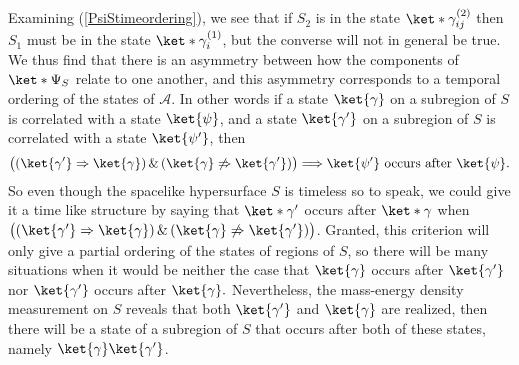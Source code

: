 Examining (\ref{PsiStimeordering}), we see that if $S_2$ is in the state $\ket*{\gamma^{(2)}_{ij}}$ then $S_1$ must be in the state $\ket*{\gamma^{(1)}_{i}}$, but the converse will not in general be true. We thus find that there is an asymmetry between how the components of $\ket*{\Psi_S}$ relate to one another, and this asymmetry corresponds to a temporal ordering of the states of $\mathcal{A}$. In other words if a state $\ket{\gamma}$ on a subregion of $S$ is correlated with a state $\ket{\psi}$, and a state $\ket{\gamma'}$ on a subregion of $S$ is correlated with a state $\ket{\psi'}$, then 
\begin{equation}\label{timeordering}
\big((\ket{\gamma'}\Rightarrow\ket{\gamma})\,\& \,(\ket{\gamma}\not\Rightarrow\ket{\gamma'})\big) \Longrightarrow \ket{\psi'} \text{ occurs after }\ket{\psi}.
\end{equation}
So even though the spacelike hypersurface $S$ is timeless so to speak, we could give it a time like structure by saying that $\ket*{\gamma'}$ occurs after $\ket*{\gamma}$ when $\big((\ket{\gamma'}\Rightarrow\ket{\gamma})\,\& \,(\ket{\gamma}\not\Rightarrow\ket{\gamma'})\big)$. Granted, this criterion will only give a partial ordering of the states of regions of $S$, so there will be many situations when it would be neither the case that  $\ket{\gamma}$ occurs after $\ket{\gamma'}$ nor $\ket{\gamma'}$ occurs after $\ket{\gamma}.$ Nevertheless, the mass-energy density measurement on $S$ reveals that both $\ket{\gamma'}$ and $\ket{\gamma}$ are realized, then there will be a state of a subregion of $S$ that occurs after both of these states, namely $\ket{\gamma}\ket{\gamma'}$.